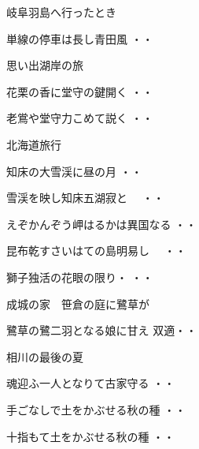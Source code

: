 \vspace{0.6cm}
岐阜羽島へ行ったとき
\begin{shiika}単線の停車は長し青田風
\hfill{・・}\end{shiika}
\vspace{0.6cm}
思い出湖岸の旅
\begin{shiika}花栗の香に堂守の鍵開く
\hfill{・・}\end{shiika}
\begin{shiika}老鴬や堂守力こめて説く
\hfill{・・}\end{shiika}
\vspace{0.6cm}
北海道旅行
\begin{shiika}知床の大雪渓に昼の月
\hfill{・・}\end{shiika}
\begin{shiika}雪渓を映し知床五湖寂と　
\hfill{・・}\end{shiika}
\begin{shiika}えぞかんぞう岬はるかは異国なる
\hfill{・・}\end{shiika}
\begin{shiika}昆布乾すさいはての島明易し　
\hfill{・・}\end{shiika}
\begin{shiika}獅子独活の花眼の限り・
\hfill{・・}\end{shiika}
\vspace{0.6cm}
成城の家　笹倉の庭に鷺草が
\begin{shiika}鷺草の鷺二羽となる娘に甘え
\hfill{双適・・}\end{shiika}
\vspace{0.6cm}
相川の最後の夏
\begin{shiika}魂迎ふ一人となりて古家守る
\hfill{・・}\end{shiika}
\vspace{0.6cm}
\begin{shiika}手ごなしで土をかぶせる秋の種
\hfill{・・}\end{shiika}
\begin{shiika}十指もて土をかぶせる秋の種
\hfill{・・}\end{shiika}
